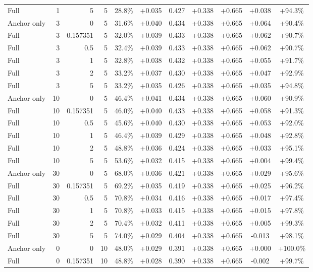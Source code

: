 \begin{table}[htbp]
\begin{tabular}{lrrrccccccc}
Full & 1 & 5 & 5 & 28.8\% & +0.035 & 0.427 & +0.338 & +0.665 & +0.038 & +94.3\% \\
Anchor only & 3 & 0 & 5 & 31.6\% & +0.040 & 0.434 & +0.338 & +0.665 & +0.064 & +90.4\% \\
Full & 3 & 0.157351 & 5 & 32.0\% & +0.039 & 0.433 & +0.338 & +0.665 & +0.062 & +90.7\% \\
Full & 3 & 0.5 & 5 & 32.4\% & +0.039 & 0.433 & +0.338 & +0.665 & +0.062 & +90.7\% \\
Full & 3 & 1 & 5 & 32.8\% & +0.038 & 0.432 & +0.338 & +0.665 & +0.055 & +91.7\% \\
Full & 3 & 2 & 5 & 33.2\% & +0.037 & 0.430 & +0.338 & +0.665 & +0.047 & +92.9\% \\
Full & 3 & 5 & 5 & 33.2\% & +0.035 & 0.426 & +0.338 & +0.665 & +0.035 & +94.8\% \\
Anchor only & 10 & 0 & 5 & 46.4\% & +0.041 & 0.434 & +0.338 & +0.665 & +0.060 & +90.9\% \\
Full & 10 & 0.157351 & 5 & 46.0\% & +0.040 & 0.433 & +0.338 & +0.665 & +0.058 & +91.3\% \\
Full & 10 & 0.5 & 5 & 45.6\% & +0.040 & 0.430 & +0.338 & +0.665 & +0.053 & +92.0\% \\
Full & 10 & 1 & 5 & 46.4\% & +0.039 & 0.429 & +0.338 & +0.665 & +0.048 & +92.8\% \\
Full & 10 & 2 & 5 & 48.8\% & +0.036 & 0.424 & +0.338 & +0.665 & +0.033 & +95.1\% \\
Full & 10 & 5 & 5 & 53.6\% & +0.032 & 0.415 & +0.338 & +0.665 & +0.004 & +99.4\% \\
Anchor only & 30 & 0 & 5 & 68.0\% & +0.036 & 0.421 & +0.338 & +0.665 & +0.029 & +95.6\% \\
Full & 30 & 0.157351 & 5 & 69.2\% & +0.035 & 0.419 & +0.338 & +0.665 & +0.025 & +96.2\% \\
Full & 30 & 0.5 & 5 & 70.8\% & +0.034 & 0.416 & +0.338 & +0.665 & +0.017 & +97.4\% \\
Full & 30 & 1 & 5 & 70.8\% & +0.033 & 0.415 & +0.338 & +0.665 & +0.015 & +97.8\% \\
Full & 30 & 2 & 5 & 70.4\% & +0.032 & 0.411 & +0.338 & +0.665 & +0.005 & +99.3\% \\
Full & 30 & 5 & 5 & 74.0\% & +0.029 & 0.404 & +0.338 & +0.665 & -0.013 & +98.1\% \\
Anchor only & 0 & 0 & 10 & 48.0\% & +0.029 & 0.391 & +0.338 & +0.665 & +0.000 & +100.0\% \\
Full & 0 & 0.157351 & 10 & 48.8\% & +0.028 & 0.390 & +0.338 & +0.665 & -0.002 & +99.7\% \\

\end{tabular}
\end{table}
